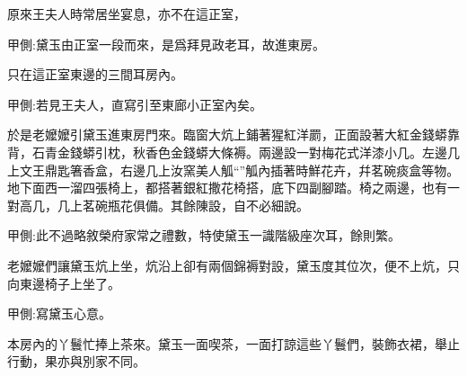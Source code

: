 \begin{parag}
    原來王夫人時常居坐宴息，亦不在這正室，\begin{note}甲側:黛玉由正室一段而來，是爲拜見政老耳，故進東房。\end{note}只在這正室東邊的三間耳房內。\begin{note}甲側:若見王夫人，直寫引至東廊小正室內矣。\end{note}於是老嬤嬤引黛玉進東房門來。臨窗大炕上鋪著猩紅洋罽，正面設著大紅金錢蟒靠背，石青金錢蟒引枕，秋香色金錢蟒大條褥。兩邊設一對梅花式洋漆小几。左邊几上文王鼎匙箸香盒，右邊几上汝窯美人觚“”觚內插著時鮮花卉，幷茗碗痰盒等物。地下面西一溜四張椅上，都搭著銀紅撒花椅搭，底下四副腳踏。椅之兩邊，也有一對高几，几上茗碗瓶花俱備。其餘陳設，自不必細說。\begin{note}甲側:此不過略敘榮府家常之禮數，特使黛玉一識階級座次耳，餘則繁。\end{note}老嬤嬤們讓黛玉炕上坐，炕沿上卻有兩個錦褥對設，黛玉度其位次，便不上炕，只向東邊椅子上坐了。\begin{note}甲側:寫黛玉心意。\end{note}本房內的丫鬟忙捧上茶來。黛玉一面喫茶，一面打諒這些丫鬟們，裝飾衣裙，舉止行動，果亦與別家不同。
\end{parag}


